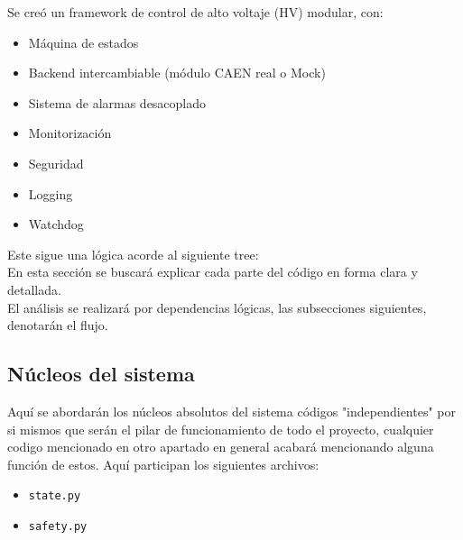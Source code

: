 \documentclass{article}
\begin{document}
Se creó un framework de control de alto voltaje (HV) modular, con: 
\begin{itemize}
    \item Máquina de estados
    \item Backend intercambiable (módulo CAEN real o Mock)
    \item Sistema de alarmas desacoplado
    \item Monitorización
    \item Seguridad
    \item Logging
    \item Watchdog
\end{itemize}
Este sigue una lógica acorde al siguiente tree:
\newline
{}\\

En esta sección se buscará explicar cada parte del código en forma clara y detallada.\\

El análisis se realizará por dependencias lógicas, las subsecciones siguientes, denotarán el flujo.
 
\subsection{Núcleos del sistema}
Aquí se abordarán los núcleos absolutos del sistema códigos "independientes" por si mismos que serán el pilar de funcionamiento de todo el proyecto, cualquier codigo mencionado en otro apartado en general acabará mencionando alguna función de estos. 
Aquí participan los siguientes archivos:
\begin{itemize}
    \item \texttt{state.py}
    \item \texttt{safety.py}
\end{itemize}
\end{document}
